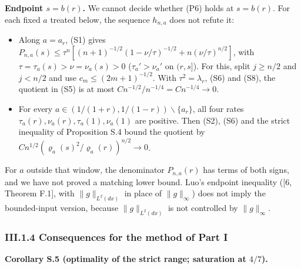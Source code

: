 \documentclass[
  british,
  10pt,
]{article}
\providecommand{\tightlist}{%
  \setlength{\itemsep}{0pt}\setlength{\parskip}{0pt}}
\begin{document}
\textbf{Endpoint \(s=b(r)\).} We cannot decide whether (P6) holds at
\(s=b(r)\). For each fixed \(a\) treated below, the sequence \(h_{n,a}\)
does not refute it:

\begin{itemize}
\tightlist
\item
  Along \(a=a_r\), (S1) gives
  \(P_{n,a}(s)\le\tau^n[(n+1)^{-1/2}(1-\nu/\tau)^{-1/2}+n(\nu/\tau)^{n/2}]\),
  with \(\tau=\tau_a(s)>\nu=\nu_a(s)>0\) (\(\tau_a'>\nu_a'\) on
  \((r,s]\)). For this, split \(j\ge n/2\) and \(j<n/2\) and use
  \(c_m\le(2m+1)^{-1/2}\). With \(\tau^2=\lambda_r\), (S6) and (S8), the
  quotient in (S5) is at most \(C n^{-1/2}/n^{-1/4}=Cn^{-1/4}\to0\).
\item
  For every \(a\in(1/(1+r),1/(1-r))\mathbin{\backslash}\{a_r\}\), all
  four rates \(\tau_a(r),\nu_a(r),\tau_a(1),\nu_a(1)\) are positive.
  Then (S2), (S6) and the strict inequality of Proposition S.4 bound the
  quotient by \(Cn^{1/2}(\varrho_a(s)^2/\varrho_a(r))^{n/2}\to0\).
\end{itemize}

For \(a\) outside that window, the denominator \(P_{n,a}(r)\) has terms
of both signs, and we have not proved a matching lower bound. Luo's
endpoint inequality ({[}6, Theorem F.1{]}, with \(\|g\|_{L^2(dx)}\) in
place of \(\|g\|_\infty\)) does not imply the bounded-input version,
because \(\|g\|_{L^2(dx)}\) is not controlled by \(\|g\|_\infty\).

\subsubsection{III.1.4 Consequences for the method of Part
I}\label{iii.1.4-consequences-for-the-method-of-part-i}

\textbf{Corollary S.5 (optimality of the strict range; saturation at
\(4/7\)).}
\end{document}

